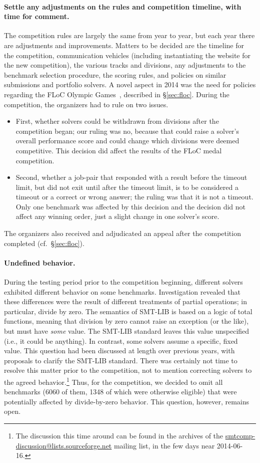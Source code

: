 \documentclass[twoside,11pt]{article}
\begin{document}
\paragraph{Settle any adjustments on the rules and competition timeline, with time for comment.}
The competition rules are largely the same from year to year, but each year there are adjustments and improvements. Matters to be decided are the timeline for the competition, communication vehicles (including instantiating the website for the new competition), the various tracks and divisions, any adjustments to the benchmark selection procedure, the scoring rules, and policies on similar submissions and portfolio solvers. A novel aspect in 2014 was the need for policies regarding the FLoC Olympic Games~\cite{FLoCGames}, described in \S\ref{sec:floc}. During the competition, the organizers had to rule on two issues.
\begin{itemize}[noitemsep,nolistsep]
\item First, whether solvers could be withdrawn from divisions after the competition began; our ruling was no, because that could raise a solver's overall performance score and could change which divisions were deemed competitive. This decision did affect the results of the FLoC medal competition.
\item Second, whether a job-pair that responded with a result before the timeout limit, but did not exit until after the timeout limit, is to be considered a timeout or a correct or wrong answer; the ruling was that it is not a timeout. Only one benchmark was affected by this decision and the decision did not affect any winning order, just a slight change in one solver's score.
\end{itemize}
The organizers also received and adjudicated an appeal after the competition completed (cf.~\S\ref{sec:floc}).

\paragraph{Undefined behavior.} \label{par:undefined} During the testing period prior to the competition beginning, different solvers exhibited different behavior on some benchmarks. Investigation revealed that these differences were the result of different treatments of partial operations; in particular, divide by zero.  The semantics of SMT-LIB is based on a logic of total functions, meaning that division by zero cannot raise an exception (or the like), but must have \emph{some} value.  The SMT-LIB standard leaves this value unspecified (i.e., it could be anything).  In contrast, some solvers assume a specific, fixed value.  This question had been discussed at length over previous years, with proposals to clarify the SMT-LIB standard.  There was certainly not time to resolve this matter prior to the competition, not to mention correcting solvers to the agreed behavior.\footnote{The discussion this time around can be found in the archives of the \url{smtcomp-discussion@lists.sourceforge.net} mailing list, in the few days near 2014-06-16.}  Thus, for the competition, we decided to omit all benchmarks (6060 of them, 1348 of which were otherwise eligible) that were potentially affected by divide-by-zero behavior.  This question, however, remains open.
\end{document}
